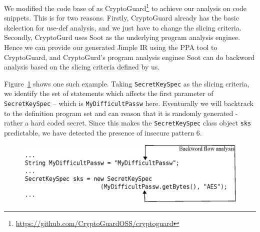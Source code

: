 
We modified the code base of  as CryptoGuard\footnote{\url{https://github.com/CryptoGuardOSS/cryptoguard}} to achieve our analysis on code snippets. This is for two reasons. Firstly, CryptoGuard already has the basic skelection for use-def analysis, and we just have to change the slicing criteria. Secondly, CryptoGurd uses Soot as the underlying program analysis enginee. Hence we can provide our generated Jimple IR using the PPA tool to CryptoGuard, and   CryptoGurd's program analysis enginee Soot can do backword analysis based on the slicing criteria defined by us.

Figure~\ref{fig:slicing} shows one such example. Taking \texttt{SecretKeySpec} as the slicing criteria, we identify the set of statements which affects the first parameter of \texttt{SecretKeySpec} -- which is \texttt{MyDifficultPassw} here. Eventurally we will backtrack to the definition program set and can reason that it is randomly generated - rather a hard coded  secret. Since this makes the \texttt{SecretKeySpec} class object \texttt{sks} predictable, we have detected the presence of insecure pattern 6.

\begin{figure}[ht]
\includegraphics[width=\linewidth]{Figures/bckfwanalysis.eps}
\caption{}
\label{fig:slicing}
\end{figure}


